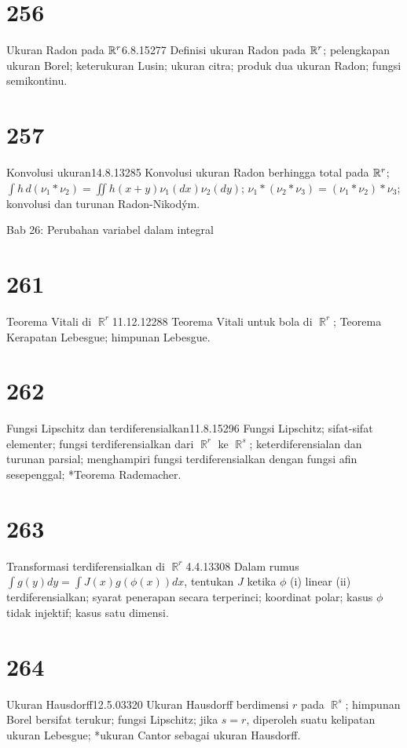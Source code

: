 \section{256}{Ukuran Radon pada $\Bbb{R}^r$}{6.8.15}{277}{}
{Definisi ukuran Radon pada $\Bbb{R}^r$; pelengkapan ukuran Borel;
keterukuran Lusin; ukuran citra;
produk dua ukuran Radon; fungsi semikontinu.}

\section{257}{Konvolusi ukuran}{14.8.13}{285}{}
{Konvolusi ukuran Radon berhingga total pada $\Bbb{R}^r$;
${\int}h\,d(\nu_1*\nu_2)={\iint}h(x+y)\nu_1(dx)\nu_2(dy)$;
$\nu_1*(\nu_2*\nu_3)=(\nu_1*\nu_2)*\nu_3$; konvolusi dan
turunan Radon-Nikod\'ym.}


 Bab 26:  Perubahan variabel dalam integral


\section{261}{Teorema Vitali di $\BbbR^r$}{11.12.12}{288}{}
{Teorema Vitali untuk bola di $\BbbR^r$; Teorema Kerapatan
Lebesgue; himpunan Lebesgue.}

\section{262}{Fungsi Lipschitz dan terdiferensialkan}{11.8.15}{296}{}
{Fungsi Lipschitz; sifat-sifat elementer; fungsi terdiferensialkan
dari $\BbbR^r$ ke $\BbbR^s$; keterdiferensialan dan turunan parsial;
menghampiri fungsi terdiferensialkan dengan fungsi afin sesepenggal;
*Teorema Rademacher.}

\section{263}{Transformasi terdiferensialkan di $\BbbR^r$}{4.4.13}{308}{}
{Dalam rumus ${\int}g(y)dy={\int}J(x)g(\phi(x))dx$, tentukan $J$ ketika
$\phi$ (i) linear (ii) terdiferensialkan; syarat penerapan secara
terperinci; koordinat polar; kasus $\phi$ tidak injektif;
kasus satu dimensi.}

\section{264}{Ukuran Hausdorff}{12.5.03}{320}{}
{Ukuran Hausdorff berdimensi $r$ pada $\BbbR^s$; himpunan Borel
bersifat terukur; fungsi Lipschitz; jika $s=r$, diperoleh suatu kelipatan
ukuran Lebesgue; *ukuran Cantor sebagai ukuran Hausdorff.}

